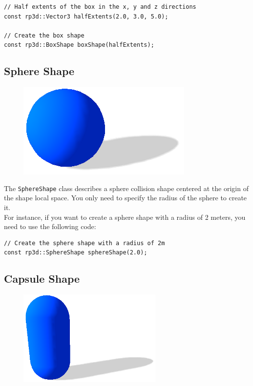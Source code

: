\documentclass[a4paper,12pt]{article}
\begin{document}
    \begin{lstlisting}
// Half extents of the box in the x, y and z directions
const rp3d::Vector3 halfExtents(2.0, 3.0, 5.0);

// Create the box shape
const rp3d::BoxShape boxShape(halfExtents);
  \end{lstlisting}

    \vspace{0.6cm}

    \subsection{Sphere Shape}

    \begin{figure}[h]
        \centering
        \includegraphics{sphereshape.png}
        \label{fig:sphereshape}
    \end{figure}

    The \texttt{SphereShape} class describes a sphere collision shape centered at the origin of the shape local space. You only need to specify the radius of the sphere to create it. \\

    For instance, if you want to create a sphere shape with a radius of 2 meters, you need to use the following code: \\

    \begin{lstlisting}
// Create the sphere shape with a radius of 2m
const rp3d::SphereShape sphereShape(2.0);
  \end{lstlisting}

    \vspace{0.6cm}

    \subsection{Capsule Shape}

    \begin{figure}[h]
        \centering
        \includegraphics{capsuleshape.png}
        \label{fig:capsuleshape}
    \end{figure}
\end{document}
